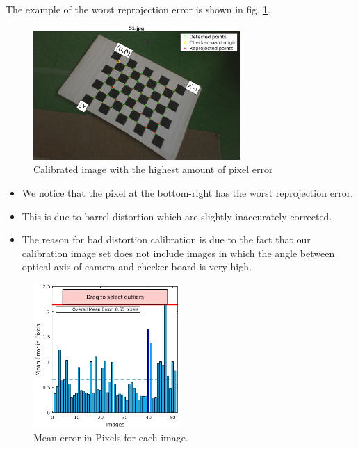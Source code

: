 The example of the worst reprojection error is shown in fig. \ref{fig:worst-calibrated-image}.
\begin{figure}[H]
\begin{center}
\includegraphics[width=0.7\textwidth]{graphics/worst.png}
\caption{Calibrated image with the highest amount of pixel error}
\label{fig:worst-calibrated-image}
\end{center}
\end{figure}
\begin{itemize}
\item We notice that the pixel at the bottom-right has the worst reprojection error.
\item This is due to barrel distortion which are slightly inaccurately corrected.
\item The reason for bad distortion calibration is due to the fact that our calibration image set does not include images in which the angle between optical axis of camera and checker board is very high.
\end{itemize}

\begin{figure}[H]
\begin{center}
\includegraphics[width=0.5\textwidth]{graphics/stats.png}
\caption{Mean error in Pixels for each image.}
\label{fig:stats}
\end{center}
\end{figure}

